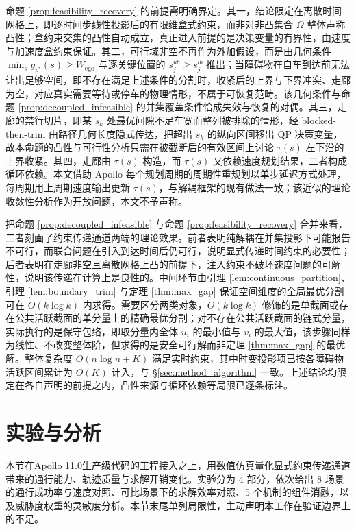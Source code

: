 \documentclass[a4paper,11pt]{ctexart}
\theoremstyle{definition}
\begin{document}
命题 \ref{prop:feasibility_recovery} 的前提需明确界定。其一，结论限定在离散时间网格上，即逐时间步线性投影后的有限维盒式约束，而非对非凸集合 $\Omega$ 整体声称凸性；盒约束交集的凸性自动成立，真正进入前提的是决策变量的有界性，由速度与加速度盒约束保证。其二，可行域非空不再作为外加假设，而是由几何条件 $\min_s g_{p^{*}}(s) \geq W_{\text{ego}}$ 与逐关键位置的 $s_j^{ub} \geq s_j^{lb}$ 推出；当障碍物在自车到达前无法让出足够空间，即不存在满足上述条件的分割时，收紧后的上界与下界冲突、走廊为空，对应真实需要等待或停车的物理情形，不属于可恢复范畴。该几何条件与命题 \ref{prop:decoupled_infeasible} 的并集覆盖条件恰成失效与恢复的对偶。其三，走廊的禁行切片，即某 $s_k$ 处最优间隙不足车宽而整列被排除的情形，经 blocked-then-trim 由路径几何长度隐式传达，把超出 $s_k$ 的纵向区间移出 QP 决策变量，故本命题的凸性与可行性分析只需在被截断后的有效区间上讨论 $\tau(s)$ 左下沿的上界收紧。其四，走廊由 $\tau(s)$ 构造，而 $\tau(s)$ 又依赖速度规划结果，二者构成循环依赖。本文借助 Apollo 每个规划周期的周期性重规划以单步延迟方式处理，每周期用上周期速度输出更新 $\tau(s)$，与解耦框架的现有做法一致；该近似的理论收敛性分析作为开放问题，本文不予声称。

把命题 \ref{prop:decoupled_infeasible} 与命题 \ref{prop:feasibility_recovery} 合并来看，二者刻画了约束传递通道两端的理论效果。前者表明纯解耦在并集投影下可能报告不可行，而联合问题在引入到达时间后仍可行，说明显式传递时间约束的必要性；后者表明在走廊非空且离散网格上凸的前提下，注入约束不破坏速度问题的可解性，说明该传递在计算上是良性的。中间环节由引理 \ref{lem:continuous_partition}、引理 \ref{lem:boundary_trim} 与定理 \ref{thm:max_gap} 保证空间维度的全局最优分割可在 $O(k \log k)$ 内求得。需要区分两类对象，$O(k\log k)$ 修饰的是单截面或存在公共活跃截面的单分量上的精确最优分割；对不存在公共活跃截面的链式分量，实际执行的是保守包络，即取分量内全体 $u_i$ 的最小值与 $v_i$ 的最大值，该步骤同样为线性、不改变整体阶，但求得的是安全可行解而非定理 \ref{thm:max_gap} 的最优解。整体复杂度 $O(n \log n + K)$ 满足实时约束，其中时变投影项已按各障碍物活跃区间累计为 $O(K)$ 计入，与 §\ref{sec:method_algorithm} 一致。上述结论均限定在各自声明的前提之内，凸性来源与循环依赖等局限已逐条标注。

\section{实验与分析}
\label{sec:experiment}

本节在Apollo 11.0生产级代码的工程接入之上，用数值仿真量化显式约束传递通道带来的通行能力、轨迹质量与求解开销变化。实验分为 4 部分，依次给出 8 场景的通行成功率与速度对照、可比场景下的求解效率对照、5 个机制的组件消融，以及威胁度权重的灵敏度分析。本节末尾单列局限性，主动声明本工作在验证边界上的不足。
\end{document}
